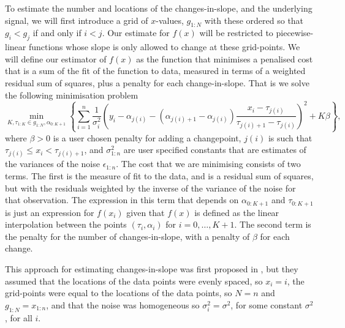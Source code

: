 \documentclass[nojss]{jss}
\begin{document}
To estimate the number and locations of the changes-in-slope, and the underlying signal, we will first introduce a grid of $x$-values, $g_{1:N}$ with these ordered so that $g_i<g_j$ if and only if $i<j$. Our estimate for $f(x)$ will be restricted to piecewise-linear functions whose slope is only allowed to change at these grid-points. We will define our estimator of $f(x)$ as the function that minimises a penalised cost that is a sum of the fit of the function to data, measured in terms of a weighted residual sum of squares, plus a penalty for each change-in-slope. That is we solve the following minimisation problem
\begin{equation} \label{eq:penalised_cost}
\min_{K,\tau_{1:K}\in g_{1:N}, \alpha_{0:K+1} } \left\{
\sum_{i=1}^n \frac{1}{\sigma^2_i} \left(y_i -  \alpha_{j(i)}-(\alpha_{j(i)+1}-  \alpha_{j(i)})\frac{x_i-\tau_{j(i)}}{\tau_{j(i)+1}-\tau_{j(i)}}   \right)^2
+K\beta
\right\},
\end{equation}
where $\beta>0$ is a user chosen penalty for adding a changepoint, $j(i)$ is such that $\tau_{j(i)}\leq x_i < \tau_{j(i)+1}$, and $\sigma^2_{1:n}$ are user specified constants that are estimates of the variances of the noise $\epsilon_{1:n}$. The cost that we are minimising consists of two terms. The first is the measure of fit to the data, and is a residual sum of squares, but with the residuals weighted by the inverse of the variance of the noise for that observation. The expression in this term that depends on $\alpha_{0:K+1}$ and $\tau_{0:K+1}$ is just an expression for $f(x_i)$ given that $f(x)$ is defined as the linear interpolation between the points $(\tau_i,\alpha_i)$ for $i=0,\ldots,K+1$. The second term is the penalty for the number of changes-in-slope, with a penalty of $\beta$ for each change.

This approach for estimating changes-in-slope was first proposed in \cite{fearnhead2019detecting}, but they assumed that the locations of the data points were evenly spaced, so $x_i=i$, the grid-points were equal to the locations of the data points, so $N=n$ and $g_{1:N}=x_{1:n}$, and that the noise was homogeneous so $\sigma^2_i=\sigma^2$, for some constant $\sigma^2$, for all $i$. 
\end{document}
